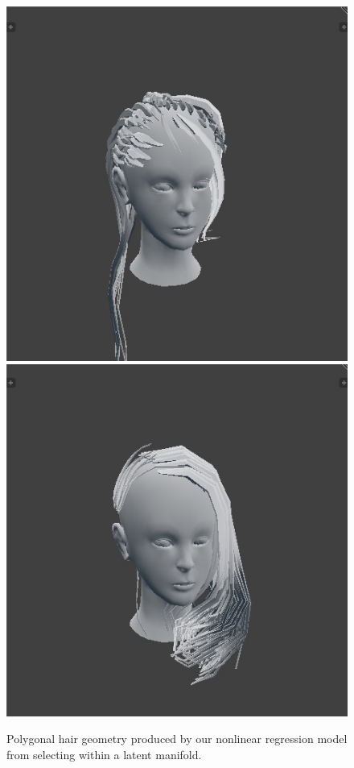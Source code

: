 \documentclass[ %
author={Dillon Keith Diep},
supervisor={Dr. Carl Henrik Ek},
degree={MEng},
title={ART-CG Hair:},
subtitle={Assisted Real-time Content Generation of Stylised Virtual Hair},
type={Research},
year={2017} ]{dissertation}
\begin{document}
\begin{figure}[!h]
	\centering
	\caption{Polygonal hair geometry produced by our nonlinear regression model from selecting within a latent manifold.}
	\includegraphics[scale=0.25]{images/outputMesh1}
	\includegraphics[scale=0.25]{images/outputMesh2}

\end{figure}
\end{document}
